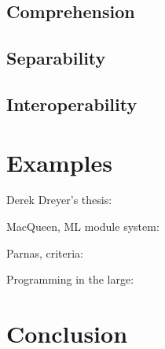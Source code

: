 \documentclass{sigplanconf}[10pt]
\begin{document}
\subsection{Comprehension}

\subsection{Separability}

\subsection{Interoperability}

\section{Examples}

Derek Dreyer's thesis:
~\cite{dreyer2005understanding}

MacQueen, ML module system:
~\cite{macqueen1984modules}

Parnas, criteria:
~\cite{parnas1972criteria}

Programming in the large:
~\cite{deremer1976programming}

\section{Conclusion}




\end{document}
